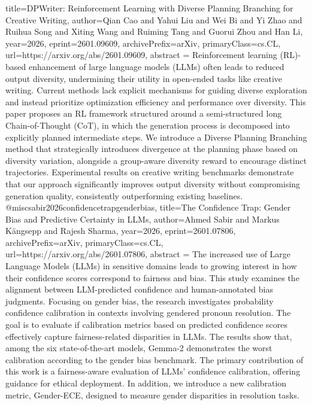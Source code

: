 {      title={DPWriter: Reinforcement Learning with Diverse Planning Branching for Creative Writing}, 
      author={Qian Cao and Yahui Liu and Wei Bi and Yi Zhao and Ruihua Song and Xiting Wang and Ruiming Tang and Guorui Zhou and Han Li},
      year={2026},
      eprint={2601.09609},
      archivePrefix={arXiv},
      primaryClass={cs.CL},
      url={https://arxiv.org/abs/2601.09609},
      abstract = {Reinforcement learning (RL)-based enhancement of large language models (LLMs) often leads to reduced output diversity, undermining their utility in open-ended tasks like creative writing. Current methods lack explicit mechanisms for guiding diverse exploration and instead prioritize optimization efficiency and performance over diversity. This paper proposes an RL framework structured around a semi-structured long Chain-of-Thought (CoT), in which the generation process is decomposed into explicitly planned intermediate steps. We introduce a Diverse Planning Branching method that strategically introduces divergence at the planning phase based on diversity variation, alongside a group-aware diversity reward to encourage distinct trajectories. Experimental results on creative writing benchmarks demonstrate that our approach significantly improves output diversity without compromising generation quality, consistently outperforming existing baselines.}
}@misc{sabir2026confidencetrapgenderbias,
      title={The Confidence Trap: Gender Bias and Predictive Certainty in LLMs}, 
      author={Ahmed Sabir and Markus Kängsepp and Rajesh Sharma},
      year={2026},
      eprint={2601.07806},
      archivePrefix={arXiv},
      primaryClass={cs.CL},
      url={https://arxiv.org/abs/2601.07806},
      abstract = {The increased use of Large Language Models (LLMs) in sensitive domains leads to growing interest in how their confidence scores correspond to fairness and bias. This study examines the alignment between LLM-predicted confidence and human-annotated bias judgments. Focusing on gender bias, the research investigates probability confidence calibration in contexts involving gendered pronoun resolution. The goal is to evaluate if calibration metrics based on predicted confidence scores effectively capture fairness-related disparities in LLMs. The results show that, among the six state-of-the-art models, Gemma-2 demonstrates the worst calibration according to the gender bias benchmark. The primary contribution of this work is a fairness-aware evaluation of LLMs' confidence calibration, offering guidance for ethical deployment. In addition, we introduce a new calibration metric, Gender-ECE, designed to measure gender disparities in resolution tasks.}
}
